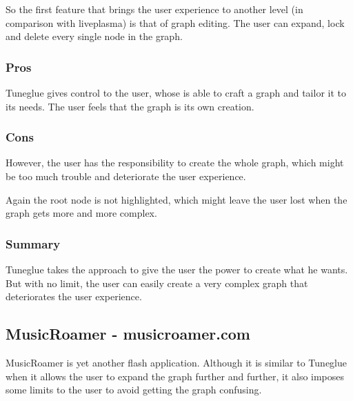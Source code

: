     So the first feature that brings the user experience to another level (in comparison with liveplasma) is that of graph editing.
    The user can expand, lock and delete every single node in the graph.


    \subsubsection{Pros} %
    \label{ssub:audiomap_pros}

      Tuneglue gives control to the user, whose is able to craft a graph and tailor it to its needs.
      The user feels that the graph is its own creation.


    \subsubsection{Cons} %
    \label{ssub:audiomap_cons}

      However, the user has the responsibility to create the whole graph, which might be too much trouble and deteriorate the user experience.

      Again the root node is not highlighted, which might leave the user lost when the graph gets more and more complex.


    \subsubsection{Summary} %
    \label{ssub:audiomap_summary}

      Tuneglue takes the approach to give the user the power to create what he wants.
      But with no limit, the user can easily create a very complex graph that deteriorates the user experience.




  \subsection{MusicRoamer - musicroamer.com} %
  \label{sub:musicroamer}

    MusicRoamer is yet another flash application.
    Although it is similar to Tuneglue when it allows the user to expand the graph further and further, it also imposes some limits to the user to avoid getting the graph confusing.

